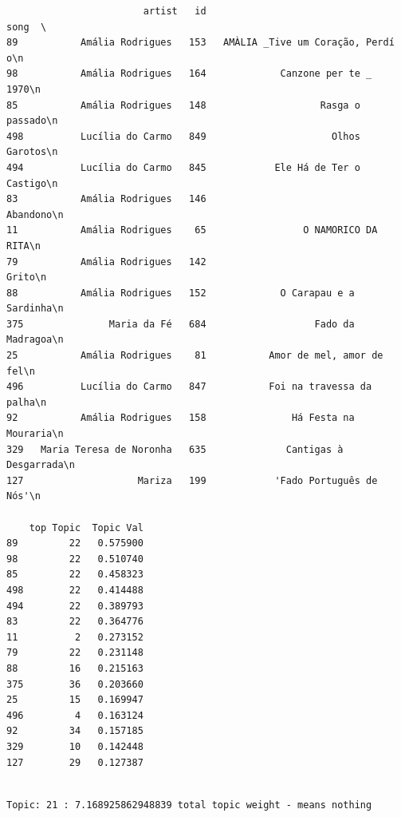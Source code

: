 \documentclass[11pt]{article}
\begin{document}
    
    \begin{verbatim}
                        artist   id                                 song  \
89           Amália Rodrigues   153   AMÀLIA _Tive um Coração, Perdí o\n   
98           Amália Rodrigues   164             Canzone per te _  1970\n   
85           Amália Rodrigues   148                    Rasga o passado\n   
498          Lucília do Carmo   849                      Olhos Garotos\n   
494          Lucília do Carmo   845            Ele Há de Ter o Castigo\n   
83           Amália Rodrigues   146                           Abandono\n   
11           Amália Rodrigues    65                 O NAMORICO DA RITA\n   
79           Amália Rodrigues   142                              Grito\n   
88           Amália Rodrigues   152             O Carapau e a Sardinha\n   
375               Maria da Fé   684                   Fado da Madragoa\n   
25           Amália Rodrigues    81           Amor de mel, amor de fel\n   
496          Lucília do Carmo   847           Foi na travessa da palha\n   
92           Amália Rodrigues   158               Há Festa na Mouraria\n   
329   Maria Teresa de Noronha   635              Cantigas à Desgarrada\n   
127                    Mariza   199            'Fado Português de Nós'\n   

    top Topic  Topic Val  
89         22   0.575900  
98         22   0.510740  
85         22   0.458323  
498        22   0.414488  
494        22   0.389793  
83         22   0.364776  
11          2   0.273152  
79         22   0.231148  
88         16   0.215163  
375        36   0.203660  
25         15   0.169947  
496         4   0.163124  
92         34   0.157185  
329        10   0.142448  
127        29   0.127387  
    \end{verbatim}

    
    \begin{Verbatim}[commandchars=\\\{\}]

Topic: 21 : 7.168925862948839 total topic weight - means nothing

    \end{Verbatim}
\end{document}

